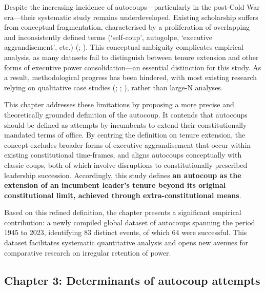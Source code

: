 \documentclass[
  12pt,
]{report}
\begin{document}
Despite the increasing incidence of autocoups---particularly in the
post-Cold War era---their systematic study remains underdeveloped.
Existing scholarship suffers from conceptual fragmentation,
characterised by a proliferation of overlapping and inconsistently
defined terms (`self-coup', autogolpe, `executive aggrandisement', etc.)
(;
). This conceptual
ambiguity complicates empirical analysis, as many datasets fail to
distinguish between tenure extension and other forms of executive power
consolidation---an essential distinction for this study. As a result,
methodological progress has been hindered, with most existing research
relying on qualitative case studies (; ;
),
rather than large-N analyses.

This chapter addresses these limitations by proposing a more precise and
theoretically grounded definition of the autocoup. It contends that
autocoups should be defined as attempts by incumbents to extend their
constitutionally mandated terms of office. By centring the definition on
tenure extension, the concept excludes broader forms of executive
aggrandisement that occur within existing constitutional time-frames,
and aligns autocoups conceptually with classic coups, both of which
involve disruptions to constitutionally prescribed leadership
succession. Accordingly, this study defines \textbf{an autocoup as the
extension of an incumbent leader's tenure beyond its original
constitutional limit, achieved through extra-constitutional means}.

Based on this refined definition, the chapter presents a significant
empirical contribution: a newly compiled global dataset of autocoups
spanning the period 1945 to 2023, identifying 83 distinct events, of
which 64 were successful. This dataset facilitates systematic
quantitative analysis and opens new avenues for comparative research on
irregular retention of power.

\subsection*{Chapter 3: Determinants of autocoup
attempts}\label{chapter-3-determinants-of-autocoup-attempts}
\end{document}

